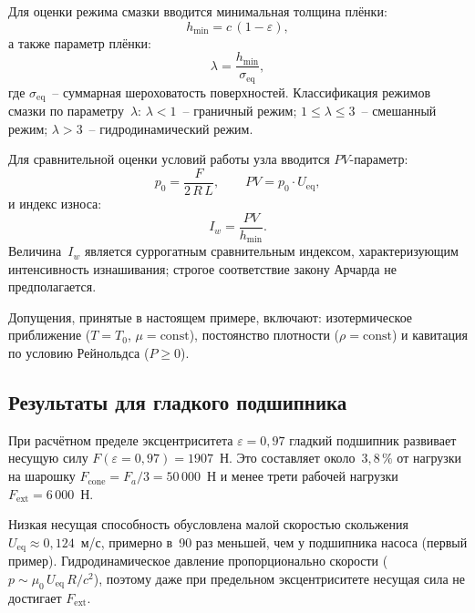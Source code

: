 Для оценки режима смазки вводится минимальная толщина плёнки:
\begin{equation}
  h_{\min} = c\,(1 - \varepsilon),
  \label{eq:bit_hmin}
\end{equation}
а также параметр плёнки:
\begin{equation}
  \lambda = \frac{h_{\min}}{\sigma_{\mathrm{eq}}},
  \label{eq:bit_lambda}
\end{equation}
где $\sigma_{\mathrm{eq}}$~-- суммарная шероховатость поверхностей.
Классификация режимов смазки по параметру~$\lambda$:
$\lambda < 1$~-- граничный режим;
$1 \leq \lambda \leq 3$~-- смешанный режим;
$\lambda > 3$~-- гидродинамический режим.

Для сравнительной оценки условий работы узла вводится
$PV$-параметр:
\begin{equation}
  p_0 = \frac{F}{2\,R\,L}, \qquad
  PV = p_0 \cdot U_{\mathrm{eq}},
  \label{eq:bit_PV}
\end{equation}
и индекс износа:
\begin{equation}
  I_w = \frac{PV}{h_{\min}}.
  \label{eq:bit_Iw}
\end{equation}
Величина~$I_w$ является суррогатным сравнительным
индексом, характеризующим интенсивность изнашивания; строгое
соответствие закону Арчарда не предполагается.

Допущения, принятые в настоящем примере, включают: изотермическое
приближение ($T = T_0$, $\mu = \mathrm{const}$), постоянство
плотности ($\rho = \mathrm{const}$) и кавитация по условию
Рейнольдса ($P \geq 0$).


\subsection{Результаты для гладкого подшипника}

При расчётном пределе эксцентриситета $\varepsilon = 0{,}97$
гладкий подшипник развивает несущую силу
$F(\varepsilon = 0{,}97) = 1907$~Н. Это составляет около~$3{,}8\,\%$
от нагрузки на шарошку $F_{\mathrm{cone}} = F_a / 3 = 50\,000$~Н
и менее трети рабочей нагрузки $F_{\mathrm{ext}} = 6\,000$~Н.

Низкая несущая способность обусловлена малой скоростью скольжения
$U_{\mathrm{eq}} \approx 0{,}124$~м/с, примерно в~90 раз меньшей,
чем у подшипника насоса (первый пример). Гидродинамическое давление
пропорционально скорости ($p \sim \mu_0\, U_{\mathrm{eq}}\, R / c^2$), поэтому даже
при предельном эксцентриситете несущая сила не достигает
$F_{\mathrm{ext}}$.

